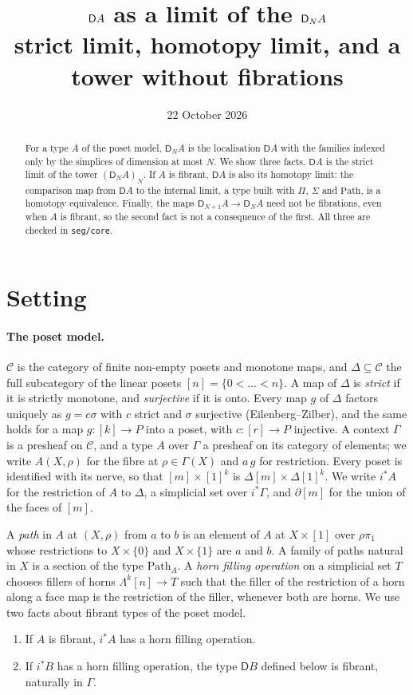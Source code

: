 \documentclass[11pt]{article}
\title{$\D A$ as a limit of the $\D_NA$\\[3pt]
\large strict limit, homotopy limit, and a tower without fibrations}
\author{}
\date{22 October 2026}
\newcommand{\C}{\mathcal{C}}
\newcommand{\Path}{\mathrm{Path}}
\newcommand{\D}{\mathsf{D}}
\newcommand{\Lam}{\Lambda}
\theoremstyle{plain}
\theoremstyle{definition}
\theoremstyle{remark}
\begin{document}
\maketitle

\begin{abstract}
\noindent
For a type $A$ of the poset model, $\D_NA$ is the localisation $\D A$
with the families indexed only by the simplices of dimension at most $N$. We show three facts. $\D A$ is the strict limit
of the tower $(\D_NA)_N$. If $A$ is fibrant, $\D A$ is also its homotopy
limit: the comparison map from $\D A$ to the internal limit, a type built
with $\Pi$, $\Sigma$ and $\Path$, is a homotopy equivalence. Finally, the
maps $\D_{N+1}A\to\D_NA$ need not be fibrations, even when $A$ is fibrant,
so the second fact is not a consequence of the first. All three are checked
in \texttt{seg/core}.
\end{abstract}

\section{Setting}\label{sec:tower}

\paragraph{The poset model.} $\C$ is the category of finite non-empty
posets and monotone maps, and $\Delta\subseteq\C$ the full subcategory of
the linear posets $[n]=\{0<\dots<n\}$. A map of $\Delta$ is \emph{strict}
if it is strictly monotone, and \emph{surjective} if it is onto. Every map
$g$ of $\Delta$ factors uniquely as $g=c\sigma$ with $c$ strict and
$\sigma$ surjective (Eilenberg--Zilber), and the same holds for a map
$g:[k]\to P$ into a poset, with $c:[r]\to P$ injective. A context $\Gamma$
is a presheaf on $\C$, and a type $A$ over $\Gamma$ a presheaf on its
category of elements; we write $A(X,\rho)$ for the fibre at $\rho\in\Gamma(X)$
and $a\,g$ for restriction. Every poset is identified with its nerve, so
that $[m]\times[1]^k$ is $\Delta[m]\times\Delta[1]^k$. We write $i^*A$ for
the restriction of $A$ to $\Delta$, a simplicial set over $i^*\Gamma$, and
$\partial[m]$ for the union of the faces of $[m]$.

A \emph{path} in $A$ at $(X,\rho)$ from $a$ to $b$ is an element of $A$
at $X\times[1]$ over $\rho\pi_1$ whose restrictions to $X\times\{0\}$ and
$X\times\{1\}$ are $a$ and $b$. A family of paths natural in $X$ is a
section of the type $\Path_A$. A \emph{horn filling operation} on a
simplicial set $T$ chooses fillers of horns $\Lam^k[n]\to T$ such that the
filler of the restriction of a horn along a face map is the restriction of
the filler, whenever both are horns. We use two facts about fibrant types
of the poset model.
\begin{enumerate}
\item[(F1)] If $A$ is fibrant, $i^*A$ has a horn filling operation.
\item[(F2)] If $i^*B$ has a horn filling operation, the type $\D B$ defined
  below is fibrant, naturally in $\Gamma$.
\end{enumerate}
\end{document}
